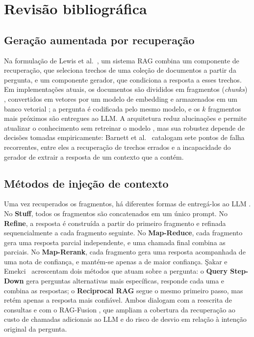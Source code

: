 \section{Revisão bibliográfica}
\label{sc:revisao}

\subsection{Geração aumentada por recuperação}

Na formulação de Lewis et al.~\cite{lewis2020rag}, um sistema RAG combina um componente de recuperação, que seleciona trechos de uma coleção de documentos a partir da pergunta, e um componente gerador, que condiciona a resposta a esses trechos. Em implementações atuais, os documentos são divididos em fragmentos (\emph{chunks}) \cite{schwaber2025chunking}, convertidos em vetores por um modelo de embedding e armazenados em um banco vetorial \cite{ma2024vectorsurvey}; a pergunta é codificada pelo mesmo modelo, e os $k$ fragmentos mais próximos são entregues ao LLM. A arquitetura reduz alucinações e permite atualizar o conhecimento sem retreinar o modelo \cite{andriopoulos2023augmenting}, mas sua robustez depende de decisões tomadas empiricamente: Barnett et al.~\cite{barnett2024seven} catalogam sete pontos de falha recorrentes, entre eles a recuperação de trechos errados e a incapacidade do gerador de extrair a resposta de um contexto que a contém.

\subsection{Métodos de injeção de contexto}

Uma vez recuperados os fragmentos, há diferentes formas de entregá-los ao LLM \cite{topsakal2023langchain}. No \textbf{Stuff}, todos os fragmentos são concatenados em um único prompt. No \textbf{Refine}, a resposta é construída a partir do primeiro fragmento e refinada sequencialmente a cada fragmento seguinte. No \textbf{Map-Reduce}, cada fragmento gera uma resposta parcial independente, e uma chamada final combina as parciais. No \textbf{Map-Rerank}, cada fragmento gera uma resposta acompanhada de uma nota de confiança, e mantém-se apenas a de maior confiança. Şakar e Emekci~\cite{sakar2025rag} acrescentam dois métodos que atuam sobre a pergunta: o \textbf{Query Step-Down} gera perguntas alternativas mais específicas, responde cada uma e combina as respostas; o \textbf{Reciprocal RAG} segue o mesmo primeiro passo, mas retém apenas a resposta mais confiável. Ambos dialogam com a reescrita de consultas \cite{ma2023query} e com o RAG-Fusion \cite{rackauckas2024ragfusion}, que ampliam a cobertura da recuperação ao custo de chamadas adicionais ao LLM e do risco de desvio em relação à intenção original da pergunta.

